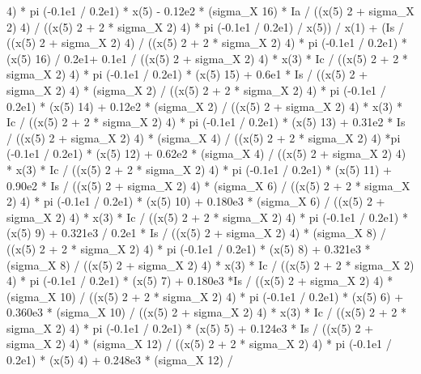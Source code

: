 \begin{maplegroup}
 4) * pi  (-0.1e1 / 0.2e1) * x(5) - 0.12e2 * (sigma\_X  16) * Ia / ((x(5)  2 + sigma\_X  2)  4) / ((x(5)  2 + 2 * sigma\_X  2)  4) * pi  (-0.1e1 / 0.2e1) / x(5)) / x(1) + (Is / ((x(5)  2 + sigma\_X  2)  4) / ((x(5)  2 + 2 * sigma\_X  2)  4) * pi  (-0.1e1 / 0.2e1) * (x(5)  16) / 0.2e1+ 0.1e1 / ((x(5)  2 + sigma\_X  2)  4) * x(3) * Ic / ((x(5)  2 + 2 * sigma\_X  2)  4) * pi  (-0.1e1 / 0.2e1) * (x(5)  15) + 0.6e1 * Is / ((x(5)  2 + sigma\_X  2)  4) * (sigma\_X  2) / ((x(5)  2 + 2 * sigma\_X  2)  4) * pi  (-0.1e1 / 0.2e1) * (x(5)  14) + 0.12e2 * (sigma\_X  2) / ((x(5)  2 + sigma\_X  2)  4) * x(3) * Ic / ((x(5)  2 + 2 * sigma\_X  2)  4) * pi  (-0.1e1 / 0.2e1) * (x(5)  13) + 0.31e2 * Is / ((x(5)  2 + sigma\_X  2)  4) * (sigma\_X  4) / ((x(5)  2 + 2 * sigma\_X  2)  4) *pi  (-0.1e1 / 0.2e1) * (x(5)  12) + 0.62e2 * (sigma\_X  4) / ((x(5)  2 + sigma\_X  2)  4) * x(3) * Ic / ((x(5)  2 + 2 * sigma\_X  2)  4) * pi  (-0.1e1 / 0.2e1) * (x(5)  11) + 0.90e2 * Is / ((x(5)  2 + sigma\_X  2)  4) * (sigma\_X  6) / ((x(5) 2 + 2 * sigma\_X  2)  4) * pi  (-0.1e1 / 0.2e1) * (x(5)  10) + 0.180e3 * (sigma\_X  6) / ((x(5)  2 + sigma\_X  2)  4) * x(3) * Ic / ((x(5)  2 + 2 * sigma\_X  2)  4) * pi  (-0.1e1 / 0.2e1) * (x(5)  9) + 0.321e3 / 0.2e1 * Is / ((x(5)  2 + sigma\_X 2)  4) * (sigma\_X  8) / ((x(5)  2 + 2 * sigma\_X  2)  4) * pi  (-0.1e1 / 0.2e1) * (x(5)  8) + 0.321e3 * (sigma\_X  8) / ((x(5)  2 + sigma\_X  2)  4) * x(3) * Ic / ((x(5)  2 + 2 * sigma\_X  2)  4) * pi  (-0.1e1 / 0.2e1) * (x(5)  7) + 0.180e3 *Is / ((x(5)  2 + sigma\_X  2)  4) * (sigma\_X  10) / ((x(5)  2 + 2 * sigma\_X  2)  4) * pi  (-0.1e1 / 0.2e1) * (x(5)  6) + 0.360e3 * (sigma\_X  10) / ((x(5)  2 + sigma\_X  2)  4) * x(3) * Ic / ((x(5)  2 + 2 * sigma\_X  2)  4) * pi  (-0.1e1 / 0.2e1) * (x(5)  5) + 0.124e3 * Is / ((x(5)  2 + sigma\_X  2)  4) * (sigma\_X  12) / ((x(5)  2 + 2 * sigma\_X  2)  4) * pi  (-0.1e1 / 0.2e1) * (x(5)  4) + 0.248e3 * (sigma\_X  12) / 
\end{maplegroup}
